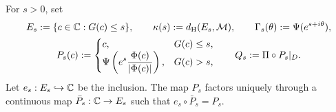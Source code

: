 \begin{definition}\label{def:green-retractions}
For \(s>0\), set
\begin{gather}
 E_s:=\{c\in\mathbb C:G(c)\le s\},\qquad
 \kappa(s):=d_{\mathrm H}(E_s,\mathcal M),\qquad
 \Gamma_s(\theta):=\Psi(e^{s+i\theta}),\label{eq:green-levels}\\
 P_s(c):=
 \begin{cases}
  c,&G(c)\le s,\\
  \displaystyle\Psi\left(e^s\frac{\Phi(c)}{|\Phi(c)|}\right),
       &G(c)>s,
 \end{cases}
 \qquad Q_s:=\Pi\circ P_s|_{D}.
 \label{eq:green-projection}
\end{gather}
Let \(e_s:E_s\hookrightarrow\mathbb C\) be the inclusion. The map \(P_s\)
factors uniquely through a continuous map \(\bar P_s:\mathbb C\to E_s\) such
that \(e_s\circ\bar P_s=P_s\).
\end{definition}

